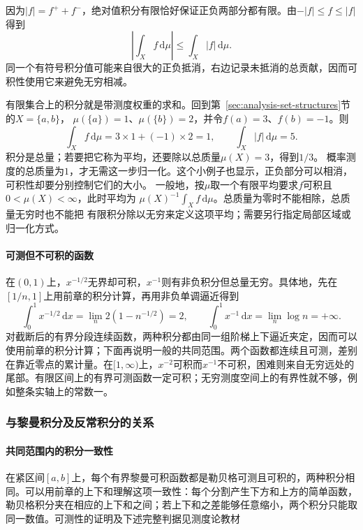 因为$|f|=f^++f^-$，绝对值积分有限恰好保证正负两部分都有限。由$- |f|\leq f\leq |f|$得到
\[
 \left|\int_X f\,\mathrm d\mu\right|\leq\int_X|f|\,\mathrm d\mu.
\]
同一个有符号积分值可能来自很大的正负抵消，右边记录未抵消的总贡献，因而可积性使用它来避免无穷相减。

有限集合上的积分就是带测度权重的求和。回到第~\ref{sec:analysis-set-structures}节的$X=\{a,b\}$，
$\mu(\{a\})=1$、$\mu(\{b\})=2$，并令$f(a)=3$、$f(b)=-1$。则
\[
 \int_Xf\,\mathrm d\mu=3\times1+(-1)\times2=1,
 \qquad \int_X|f|\,\mathrm d\mu=5.
\]
积分是总量；若要把它称为平均，还要除以总质量$\mu(X)=3$，得到$1/3$。
概率测度的总质量为$1$，才无需这一步归一化。这个小例子也显示，正负部分可以相消，
可积性却要分别控制它们的大小。
一般地，按$\mu$取一个有限平均要求$f$可积且$0<\mu(X)<\infty$，此时平均为
$\mu(X)^{-1}\int_X f\,\mathrm d\mu$。总质量为零时不能相除，总质量无穷时也不能把
有限积分除以无穷来定义这项平均；需要另行指定局部区域或归一化方式。

\paragraph{可测但不可积的函数}

在$(0,1)$上，$x^{-1/2}$无界却可积，$x^{-1}$则有非负积分但总量无穷。具体地，先在$[1/n,1]$上用前章的积分计算，再用非负单调逼近得到
\[
 \int_0^1x^{-1/2}\,\mathrm dx=\lim_n2(1-n^{-1/2})=2,
 \qquad \int_0^1x^{-1}\,\mathrm dx=\lim_n\log n=+\infty.
\]
对截断后的有界分段连续函数，两种积分都由同一组阶梯上下逼近夹定，因而可以使用前章的积分计算；下面再说明一般的共同范围。两个函数都连续且可测，差别在靠近零点的累计量。在$[1,\infty)$上，$x^{-2}$可积而$x^{-1}$不可积，困难则来自无穷远处的尾部。有限区间上的有界可测函数一定可积；无穷测度空间上的有界性就不够，例如整条实轴上的常数一。

\subsubsection{与黎曼积分及反常积分的关系}
\paragraph{共同范围内的积分一致性}

在紧区间$[a,b]$上，每个有界黎曼可积函数都是勒贝格可测且可积的，两种积分相同。可以用前章的上下和理解这项一致性：每个分割产生下方和上方的简单函数，勒贝格积分夹在相应的上下和之间；若上下和之差能够任意缩小，两个积分只能取同一数值。可测性的证明及下述完整判据见测度论教材

